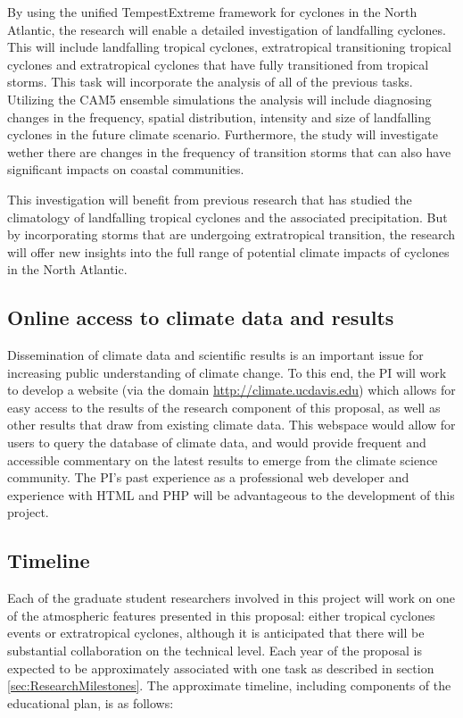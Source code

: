 \documentclass[11pt]{article}
\begin{document}
By using the unified TempestExtreme framework for cyclones in the North Atlantic, the research will enable a detailed investigation of landfalling cyclones.  This will include landfalling tropical cyclones, extratropical transitioning tropical cyclones and extratropical cyclones that have fully transitioned from tropical storms. This task will incorporate the analysis of all of the previous tasks. Utilizing the CAM5 ensemble simulations the analysis will include diagnosing changes in the frequency, spatial distribution, intensity and size of landfalling cyclones in the future climate scenario.  Furthermore, the study will investigate wether there are changes in the frequency of transition storms that can also have significant impacts on coastal communities.

This investigation will benefit from previous research that has studied the climatology of landfalling tropical cyclones and the associated precipitation. But by incorporating storms that are undergoing extratropical transition, the research will offer new insights into the full range of potential climate impacts of cyclones in the North Atlantic. 

\subsection{Online access to climate data and results}

Dissemination of climate data and scientific results is an important issue for increasing public understanding of climate change.  To this end, the PI will work to develop a website (via the domain \url{http://climate.ucdavis.edu}) which allows for easy access to the results of the research component of this proposal, as well as other results that draw from existing climate data.  This webspace would allow for users to query the database of climate data, and would provide frequent and accessible commentary on the latest results to emerge from the climate science community.  The PI's past experience as a professional web developer and experience with HTML and PHP will be advantageous to the development of this project.

\subsection{Timeline} \label{sec:Timeline}

Each of the graduate student researchers involved in this project will work on one of the atmospheric features presented in this proposal: either tropical cyclones events or extratropical cyclones, although it is anticipated that there will be substantial collaboration on the technical level.  Each year of the proposal is expected to be approximately associated with one task as described in section \ref{sec:ResearchMilestones}.  The approximate timeline, including components of the educational plan, is as follows:
\end{document}
